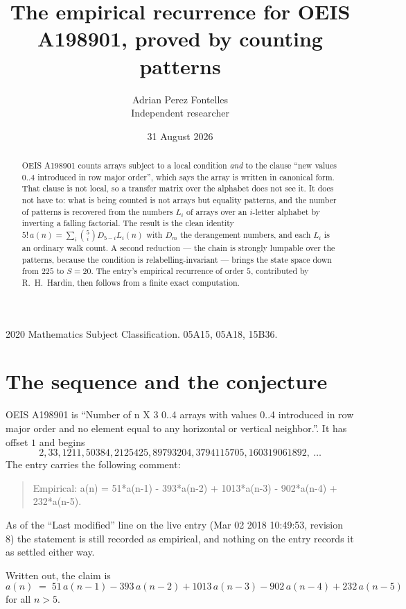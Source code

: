 \documentclass[11pt,a4paper]{article}
\title{The empirical recurrence for OEIS A198901, proved by counting patterns}
\author{Adrian Perez Fontelles\\ \small Independent researcher}
\date{31 August 2026}
\theoremstyle{plain}
\theoremstyle{definition}
\begin{document}
\maketitle

\begin{abstract}
OEIS A198901 counts arrays subject to a local condition \emph{and} to the clause ``new values
$0..4$ introduced in row major order'', which says the array is written in canonical
form. That clause is not local, so a transfer matrix over the alphabet does not see it. It
does not have to: what is being counted is not arrays but equality patterns, and the number
of patterns is recovered from the numbers $L_i$ of arrays over an $i$-letter alphabet by
inverting a falling factorial. The result is the clean identity
$5!\,a(n)=\sum_i\binom{5}{i}D_{5-i}L_i(n)$ with $D_m$ the derangement numbers,
and each $L_i$ is an ordinary walk count. A second reduction --- the chain is strongly
lumpable over the patterns, because the condition is relabelling-invariant --- brings the
state space down from $225$ to $S=20$. The entry's empirical recurrence of order
$5$, contributed by R.~H.~Hardin, then follows from a finite exact computation.
\end{abstract}

\noindent\small 2020 Mathematics Subject Classification. 05A15, 05A18, 15B36.\normalsize

\section{The sequence and the conjecture}

OEIS A198901 is ``Number of n X 3 0..4 arrays with values 0..4 introduced in row major order and no element equal to any horizontal or vertical neighbor.''. It has offset $1$ and begins
\[
2, 33, 1211, 50384, 2125425, 89793204, 3794115705, 160319061892,\ \dots
\]
The entry carries the following comment:
\begin{quote}\small
Empirical: a(n) = 51*a(n-1) - 393*a(n-2) + 1013*a(n-3) - 902*a(n-4) + 232*a(n-5).
\end{quote}
As of the ``Last modified'' line on the live entry (Mar 02 2018 10:49:53, revision 8) the statement is
still recorded as empirical, and nothing on the entry records it as settled either way.

Written out, the claim is
\begin{equation}\label{eq:conj}
a(n)\;=\;51\,a(n-1) - 393\,a(n-2) + 1013\,a(n-3) - 902\,a(n-4) + 232\,a(n-5)
\end{equation}
for all $n>5$.
\end{document}
